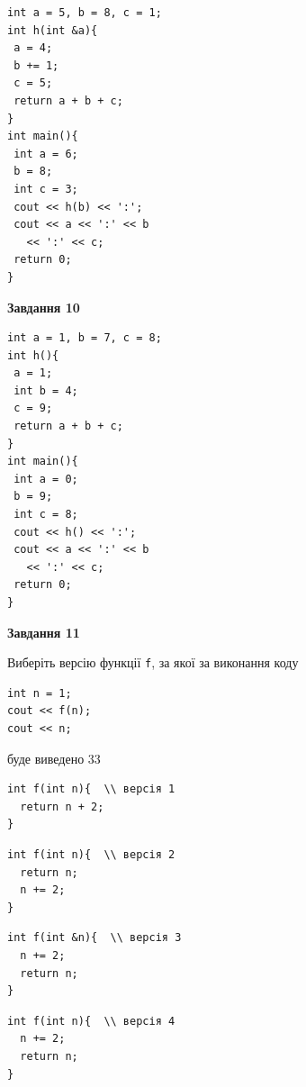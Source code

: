 \documentclass[12pt, ukrainian]{article}
\def\code#1{\Verb!#1!}
\begin{document}
{\begin {large}
\begin{minipage}[t]{7.0cm}
\begin{verbatim}
int a = 5, b = 8, c = 1;
int h(int &a){
 a = 4;
 b += 1;
 c = 5;
 return a + b + c;
}
int main(){
 int a = 6;
 b = 8;
 int c = 3;
 cout << h(b) << ':';
 cout << a << ':' << b 
   << ':' << c;
 return 0;
}
\end{verbatim}



\begin{center}
\textbf{Завдання 10}
\end{center}
\vspace{-8mm}

\begin{verbatim}
int a = 1, b = 7, c = 8;
int h(){
 a = 1;
 int b = 4;
 c = 9;
 return a + b + c;
}
int main(){
 int a = 0;
 b = 9;
 int c = 8;
 cout << h() << ':';
 cout << a << ':' << b 
   << ':' << c;
 return 0;
}
\end{verbatim}

\end{minipage}
\vline \hspace{1mm}
\begin{minipage}[t]{11.0cm}

\begin{center}
\textbf{Завдання 11}
\end{center}
Виберіть версію функції \code{f}, за якої за виконання коду
\begin{verbatim}
int n = 1;
cout << f(n);
cout << n;
\end{verbatim}

буде виведено 33

\begin{verbatim}
int f(int n){  \\ версія 1
  return n + 2;
}
\end{verbatim}

\vspace{-8mm}\begin{verbatim}
int f(int n){  \\ версія 2
  return n;
  n += 2;
}
\end{verbatim}

\vspace{-8mm}\begin{verbatim}
int f(int &n){  \\ версія 3
  n += 2;
  return n;
}
\end{verbatim}

\vspace{-8mm}\begin{verbatim}
int f(int n){  \\ версія 4
  n += 2;
  return n;
}
\end{verbatim}




\end{minipage}
\end{large}}
\end{document}
